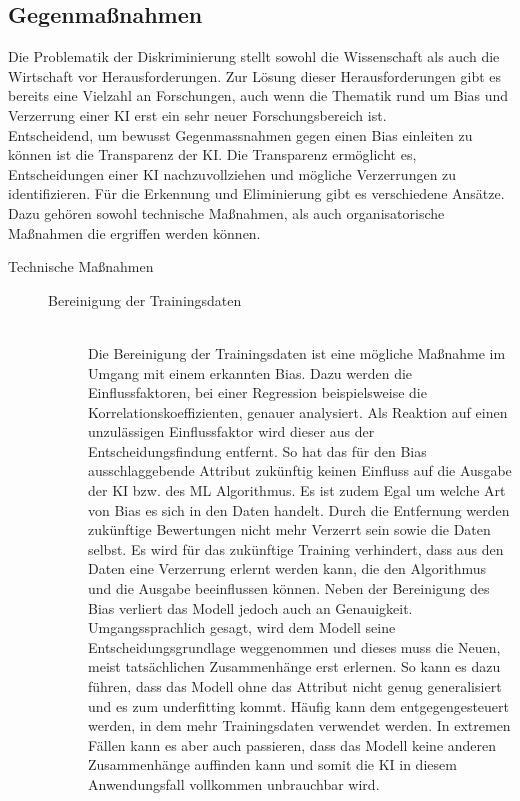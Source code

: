 \begin{onehalfspace}
    \subsection{Gegenma{\ss}nahmen}
    \label{subsubsec:gegenmassnahmen}
        Die Problematik der Diskriminierung stellt sowohl die Wissenschaft als auch die Wirtschaft vor Herausforderungen. Zur Lösung dieser Herausforderungen gibt es bereits eine Vielzahl an Forschungen, auch wenn die Thematik rund um Bias und Verzerrung einer \ac*{KI} erst ein sehr neuer Forschungsbereich ist.
        \\
        Entscheidend, um bewusst Gegenma{ss}nahmen gegen einen Bias einleiten zu können ist die Transparenz der \ac*{KI}. Die Transparenz ermöglicht es, Entscheidungen einer \ac*{KI} nachzuvollziehen und mögliche Verzerrungen zu identifizieren. Für die Erkennung und Eliminierung gibt es verschiedene Ansätze. Dazu gehören sowohl technische Maßnahmen, als auch organisatorische Maßnahmen die ergriffen werden können. 
        \begin{description}
            \item[Technische Maßnahmen] \hfill
            \begin{description}
                \item[Bereinigung der Trainingsdaten] \hfill \\
                Die Bereinigung der Trainingsdaten ist eine mögliche Maßnahme im Umgang mit einem erkannten Bias. Dazu werden die Einflussfaktoren, bei einer Regression beispielsweise die Korrelationskoeffizienten, genauer analysiert. Als Reaktion auf einen unzulässigen Einflussfaktor wird dieser aus der Entscheidungsfindung entfernt. So hat das für den Bias ausschlaggebende Attribut zukünftig keinen Einfluss auf die Ausgabe der \ac*{KI} bzw. des \ac*{ML} Algorithmus. Es ist zudem Egal um welche Art von Bias es sich in den Daten handelt. Durch die Entfernung werden zukünftige Bewertungen nicht mehr Verzerrt sein sowie die Daten selbst. Es wird für das zukünftige Training verhindert, dass aus den Daten eine Verzerrung erlernt werden kann, die den Algorithmus und die Ausgabe beeinflussen können.\cite{hagendorff2019maschinelles} Neben der Bereinigung des Bias verliert das Modell jedoch auch an Genauigkeit. Umgangssprachlich gesagt, wird dem Modell seine Entscheidungsgrundlage weggenommen und dieses muss die Neuen, meist tatsächlichen Zusammenhänge erst erlernen. So kann es dazu führen, dass das Modell ohne das Attribut nicht genug generalisiert und es zum underfitting kommt. Häufig kann dem entgegengesteuert werden, in dem mehr Trainingsdaten verwendet werden. In extremen Fällen kann es aber auch passieren, dass das Modell keine anderen Zusammenhänge auffinden kann und somit die \ac*{KI} in diesem Anwendungsfall vollkommen unbrauchbar wird.\cite{hagendorff2019maschinelles}\cite{Fabi2022}


\end{description}
\end{description}
\end{onehalfspace}
